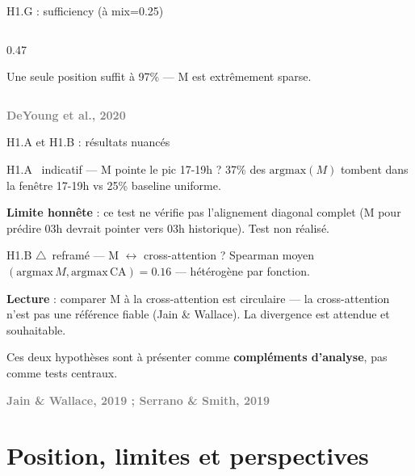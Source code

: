 \documentclass[10pt]{beamer}
\newcommand{\source}[1]{\vspace{4pt}\hfill{\textcolor{gray}{\textbf{\tiny #1}}}}
\newcommand{\ok}{\textcolor{success}{\textbf{\ding{51}}}}
\newcommand{\warn}{\textcolor{warning}{\textbf{$\triangle$}}}
\begin{document}
\begin{frame}{H1.G : sufficiency \quad\small (à mix=0.25)}
\begin{columns}
\begin{column}{0.47\textwidth}
      \begin{verdictbox}
        \centering\footnotesize
        Une seule position suffit à 97\% --- M est \alert{extrêmement sparse}.
      \end{verdictbox}
    \end{column}
  \end{columns}

  \source{DeYoung et al., 2020}
\end{frame}

\begin{frame}{H1.A et H1.B : résultats nuancés}
  \begin{block}{H1.A \quad\ok\ indicatif --- M pointe le pic 17-19h ?}
    \footnotesize
    37\% des $\mathrm{argmax}(M)$ tombent dans la fenêtre 17-19h vs 25\% baseline uniforme.

    \vspace{2pt}
    \textbf{Limite honnête} : ce test ne vérifie pas l'alignement diagonal complet (M pour prédire 03h devrait pointer vers 03h historique). Test non réalisé.
  \end{block}

  \begin{block}{H1.B \quad\warn\ reframé --- M $\leftrightarrow$ cross-attention ?}
    \footnotesize
    Spearman moyen $(\mathrm{argmax}\,M, \mathrm{argmax}\,\mathrm{CA}) = 0.16$ --- hétérogène par fonction.

    \vspace{2pt}
    \textbf{Lecture} : comparer M à la cross-attention est circulaire --- la cross-attention n'est pas une référence fiable (Jain \& Wallace). La divergence est \alert{attendue} et \alert{souhaitable}.
  \end{block}

  \begin{verdictbox}
    \centering\footnotesize
    Ces deux hypothèses sont à présenter comme \textbf{compléments d'analyse}, pas comme tests centraux.
  \end{verdictbox}

  \source{Jain \& Wallace, 2019 ; Serrano \& Smith, 2019}
\end{frame}


\section{Position, limites et perspectives}
\end{document}
